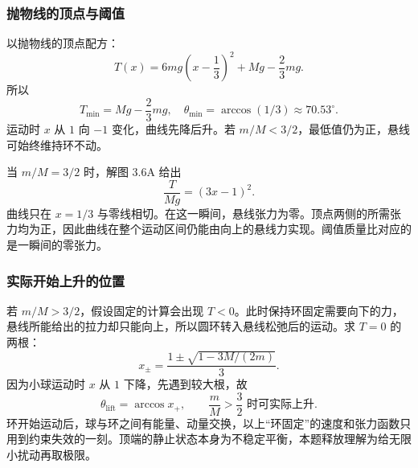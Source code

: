 \documentclass[UTF8,fontset=fandol,a4paper,11pt]{ctexart}
\begin{document}
\subsubsection*{抛物线的顶点与阈值}
以抛物线的顶点配方：
\[
T(x)=6mg\left(x-\frac13\right)^2+Mg-\frac23mg.
\]
所以
\[
\boxed{T_{\min}=Mg-\frac23mg},\quad
\boxed{\theta_{\min}=\arccos(1/3)\approx70.53^\circ}.
\]
运动时 $x$ 从 $1$ 向 $-1$ 变化，曲线先降后升。若 $m/M<3/2$，最低值仍为正，悬线可始终维持环不动。

当 $m/M=3/2$ 时，解图 3.6A 给出
\[
\boxed{\frac{T}{Mg}=(3x-1)^2}.
\]
曲线只在 $x=1/3$ 与零线相切。在这一瞬间，悬线张力为零。顶点两侧的所需张力均为正，因此曲线在整个运动区间仍能由向上的悬线力实现。阈值质量比对应的是一瞬间的零张力。

\subsubsection*{实际开始上升的位置}
若 $m/M>3/2$，假设固定的计算会出现 $T<0$。此时保持环固定需要向下的力，悬线所能给出的拉力却只能向上，所以圆环转入悬线松弛后的运动。求 $T=0$ 的两根：
\[
x_\pm=\frac{1\pm\sqrt{1-3M/(2m)}}3.
\]
因为小球运动时 $x$ 从 $1$ 下降，先遇到较大根，故
\[
\boxed{\theta_{\mathrm{lift}}=\arccos x_+},\qquad
\boxed{\frac mM>\frac32\text{ 时可实际上升}}.
\]
环开始运动后，球与环之间有能量、动量交换，以上“环固定”的速度和张力函数只用到约束失效的一刻。顶端的静止状态本身为不稳定平衡，本题释放理解为给无限小扰动再取极限。
\end{document}
